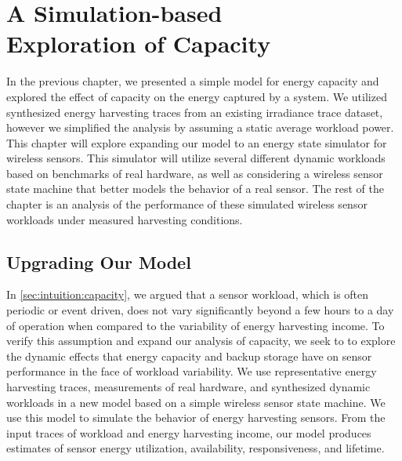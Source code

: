 \chapter[A Simulation-based Exploration of Capacity][A Simulation-based Exploration of Capacity]{A Simulation-based\\Exploration of Capacity}
\label{chap:capacity}
In the previous chapter, we presented a simple model for energy capacity and explored the effect of capacity on the energy captured by a system. 
We utilized synthesized energy harvesting traces from an existing irradiance trace dataset, however we simplified the analysis by assuming a static average workload power.
This chapter will explore expanding our model to an energy state simulator for wireless sensors.
This simulator will utilize several different dynamic workloads based on benchmarks of real hardware, as well as considering a wireless sensor state machine that better models the behavior of a real sensor.
The rest of the chapter is an analysis of the performance of these simulated wireless sensor workloads under measured harvesting conditions.

\section{Upgrading Our Model}
\label{sec:capacity:modelling}
In \cref{sec:intuition:capacity}, we argued that a sensor workload, which is often periodic or event driven, does not vary significantly beyond a few hours to a day of operation when compared to the variability of energy harvesting income. 
To verify this assumption and expand our analysis of capacity, we seek to to explore the dynamic effects that energy
capacity and backup storage have on sensor performance in the face of workload variability.
We use representative energy harvesting traces, measurements of real hardware,
and synthesized dynamic workloads in a new model based on a simple wireless sensor state machine.
We use this model to simulate
the behavior of energy harvesting sensors. 
From the input traces of workload and energy harvesting income, our model produces estimates of sensor energy utilization, availability, responsiveness, and lifetime.


